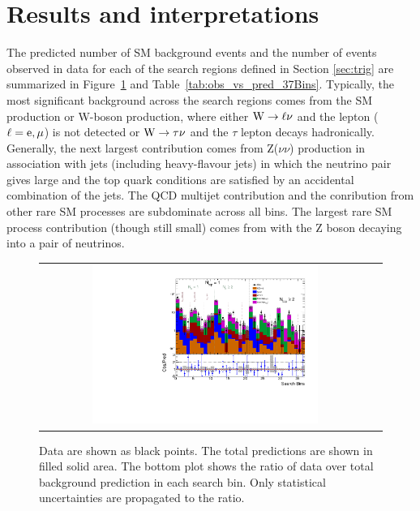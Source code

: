 \section{Results and interpretations}

The predicted number of SM background events and the number of events observed in data for each of the search regions defined in Section \ref{sec:trig} are summarized in Figure~\ref{fig:baseline_SR} and Table~\ref{tab:obs_vs_pred_37Bins}. 
%
Typically, the most significant background across the search regions comes from the SM \ttbar production or W-boson production, where either ${\rm W}\rightarrow \ell\nu$ and the lepton ($\ell={\rm e},\mu$) is not detected or ${\rm W}\rightarrow \tau\nu$ and the $\tau$ lepton decays hadronically. 
%
Generally, the next largest contribution comes from Z($\nu\nu$) production in association with jets (including heavy-flavour jets) in which the neutrino pair gives large \MET and the top quark conditions are satisfied by an accidental combination of the jets. 
%
The QCD multijet contribution and the conribution from other rare SM processes are subdominate across all bins. The largest rare SM process contribution (though still small) comes from \ttbarZ with the Z boson decaying into a pair of neutrinos. 

\begin{figure}[htbp]
  \begin{center}
  \begin{tabular}{cc}
\hspace{-1.5cm}
  \includegraphics[angle=0,width=0.70\textwidth]{figures/UnblindPlots.pdf}
  \end{tabular}
  \caption{Data are shown as black points. The total predictions are shown in filled solid area. The bottom plot shows the ratio of data over total background prediction in each search bin. Only statistical uncertainties are propagated to the ratio.}
    \label{fig:baseline_SR}
  \end{center}
\end{figure}

